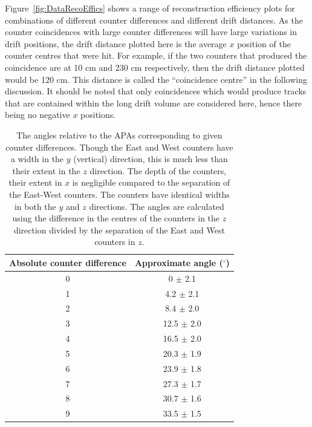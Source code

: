 Figure~\ref{fig:DataRecoEffics} shows a range of reconstruction efficiency plots for combinations of different counter differences and different drift distances. As the counter coincidences with large counter differences will have large variations in drift positions, the drift distance plotted here is the average $x$ position of the counter centres that were hit. For example, if the two counters that produced the coincidence are at 10 cm and 230 cm respectively, then the drift distance plotted would be 120 cm. This distance is called the ``coincidence centre'' in the following discussion. It should be noted that only coincidences which would produce tracks that are contained within the long drift volume are considered here, hence there being no negative $x$ positions. \\

\begin{table}
\caption[The angles relative to the APAs corresponding to given counter differences]
        {The angles relative to the APAs corresponding to given counter differences. Though the East and West counters have a width in the $y$ (vertical) direction, this is much less than their extent in the $z$ direction. The depth of the counters, their extent in $x$ is negligible compared to the separation of the East-West counters. The counters have identical widths in both the $y$ and $z$ directions. The angles are calculated using the difference in the centres of the counters in the $z$ direction divided by the separation of the East and West counters in $z$.}
\centering
\label{tab:CDiffAng}
\begin{tabular}{c c}
\toprule
{Absolute counter difference} & {Approximate angle ($^{\circ}$)} \\ 
\midrule
0 & 0    $\pm$ 2.1 \\

1 & 4.2  $\pm$ 2.1 \\

2 & 8.4  $\pm$ 2.0 \\

3 & 12.5 $\pm$ 2.0 \\

4 & 16.5 $\pm$ 2.0 \\

5 & 20.3 $\pm$ 1.9 \\

6 & 23.9 $\pm$ 1.8 \\

7 & 27.3 $\pm$ 1.7 \\

8 & 30.7 $\pm$ 1.6 \\

9 & 33.5 $\pm$ 1.5 \\
\bottomrule
\end{tabular}
\end{table}


